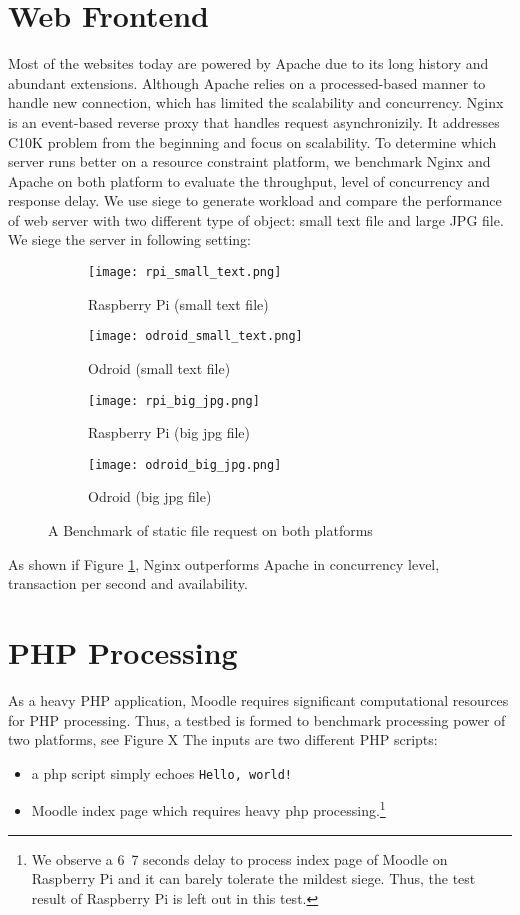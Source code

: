 \section{Web Frontend}
Most of the websites today are powered by Apache due to its long history and abundant extensions. Although Apache relies on a processed-based manner to handle new connection, which has limited the scalability and concurrency. Nginx is an event-based reverse proxy that handles request asynchronizily. It addresses C10K problem from the beginning and focus on scalability.
To determine which server runs better on a resource constraint platform, we benchmark Nginx and Apache on both platform to evaluate the throughput, level of concurrency and response delay. We use siege to generate workload and compare the performance of web server with two different type of object: small text file and large JPG file.
We siege the server in following setting:

\begin{figure}[h]
\centering
\begin{subfigure}{0.45\textwidth}
\centering
\texttt{[image: rpi\_small\_text.png]}
\caption{Raspberry Pi (small text file)}
\end{subfigure}
\begin{subfigure}{0.45\textwidth}
\centering
\texttt{[image: odroid\_small\_text.png]}
\caption{Odroid (small text file)}
\end{subfigure}

\begin{subfigure}{0.45\textwidth}
\centering
\texttt{[image: rpi\_big\_jpg.png]}
\caption{Raspberry Pi (big jpg file)}
\end{subfigure}
\begin{subfigure}{0.45\textwidth}
\centering
\texttt{[image: odroid\_big\_jpg.png]}
\caption{Odroid (big jpg file)}
\end{subfigure}

\caption{A Benchmark of static file request on both platforms}
\label{static}
\end{figure}
As shown if Figure \ref{static}, Nginx outperforms Apache in concurrency level, transaction per second and availability.

\section{PHP Processing}
As a heavy PHP application, Moodle requires significant computational resources for PHP processing. Thus, a testbed is formed to benchmark processing power of two platforms, see Figure X
The inputs are two different PHP scripts:
\begin{itemize}
\item a php script simply echoes \texttt{Hello, world!}
\item Moodle index page which requires heavy php processing.\footnote{We observe a 6~7 seconds delay to process index page of Moodle on Raspberry Pi and it can barely tolerate the mildest siege. Thus, the test result of Raspberry Pi is left out in this test.}
\end{itemize}

